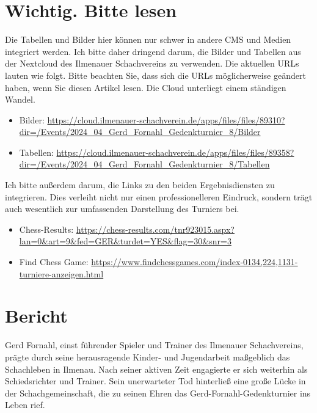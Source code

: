 \documentclass[a4paper,ngerman]{tui-algo-seminar}
\title{\inhalt}
\author{Erik Skopp}
\newcommand{\inhalt}{8. Gerd Fornahl Turnier 2024}
\begin{document}
\maketitle
\thispagestyle{plain} %
\begin{abstract}
Bericht: \inhalt.\\
Das 
\end{abstract}

\tableofcontents 
\clearpage
\section{Wichtig. Bitte lesen}

Die Tabellen und Bilder hier können nur schwer in andere CMS und Medien integriert werden. Ich bitte daher dringend darum, die Bilder und Tabellen aus der Nextcloud des Ilmenauer Schachvereins zu verwenden. Die aktuellen URLs lauten wie folgt. Bitte beachten Sie, dass sich die URLs möglicherweise geändert haben, wenn Sie diesen Artikel lesen. Die Cloud unterliegt einem ständigen Wandel.
\begin{itemize}
    \item Bilder: \url{https://cloud.ilmenauer-schachverein.de/apps/files/files/89310?dir=/Events/2024_04_Gerd_Fornahl_Gedenkturnier_8/Bilder}
    \item Tabellen: \url{https://cloud.ilmenauer-schachverein.de/apps/files/files/89358?dir=/Events/2024_04_Gerd_Fornahl_Gedenkturnier_8/Tabellen}
\end{itemize}

Ich bitte außerdem darum, die Links zu den beiden Ergebnisdiensten zu integrieren. Dies verleiht nicht nur einen professionelleren Eindruck, sondern trägt auch wesentlich zur umfassenden Darstellung des Turniers bei.

\begin{itemize}
    \item Chess-Results: \url{https://chess-results.com/tnr923015.aspx?lan=0&art=9&fed=GER&turdet=YES&flag=30&snr=3}
     \item Find Chess Game: \url{https://www.findchessgames.com/index-0134,224,1131-turniere-anzeigen.html}
\end{itemize}
\section{Bericht}
Gerd Fornahl, einst führender Spieler und Trainer des Ilmenauer Schachvereins, prägte durch seine herausragende Kinder- und Jugendarbeit maßgeblich das Schachleben in Ilmenau. Nach seiner aktiven Zeit engagierte er sich weiterhin als Schiedsrichter und Trainer. Sein unerwarteter Tod hinterließ eine große Lücke in der Schachgemeinschaft, die zu seinen Ehren das Gerd-Fornahl-Gedenkturnier ins Leben rief.\cite{fornahl2}\cite{fornahl1}
\end{document}
